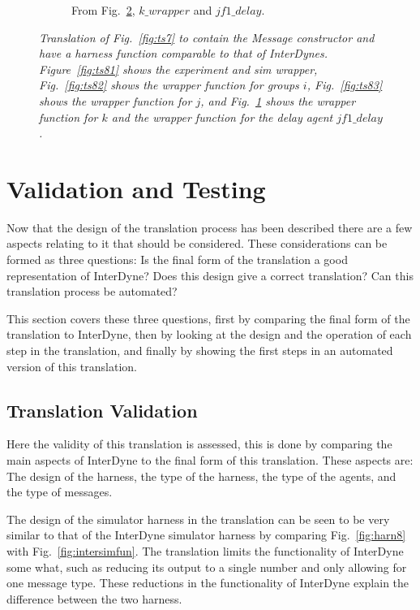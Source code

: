 \documentclass{article}
\begin{document}
\begin{figure}[H]\ContinuedFloat
	\centering
	\begin{subfigure}[b]{1\textwidth}
	
	\caption{From Fig.~\ref{fig:ts8}, $k\_wrapper$ and $jf1\_delay$.}
        \label{fig:ts84}
	\end{subfigure}
	\caption{\it Translation of Fig.~\ref{fig:ts7} to contain the Message constructor and have a harness function comparable to that of InterDynes. Figure~\ref{fig:ts81} shows the experiment and sim wrapper, Fig.~\ref{fig:ts82} shows the wrapper function for groups $i$, Fig.~\ref{fig:ts83} shows the wrapper function for $j$, and Fig.~\ref{fig:ts84} shows the wrapper function for $k$ and the wrapper function for the delay agent $jf1\_delay$.}
	\label{fig:ts8}
\end{figure} 


\newpage
\section{Validation and Testing}
Now that the design of the translation process has been described there are a few aspects relating to it that should be considered. These considerations can be formed as three questions: Is the final form of the translation a good representation of InterDyne? Does this design give a correct translation? Can this translation process be automated?   

This section covers these three questions, first by comparing the final form of the translation to InterDyne, then by looking at the design and the operation of each step in the translation, and finally by showing the first steps in an automated version of this translation.  


\subsection{Translation Validation}
Here the validity of this translation is assessed, this is done by comparing the main aspects of InterDyne to the final form of this translation. These aspects are: The design of the harness, the type of the harness, the type of the agents, and the type of messages. 

The design of the simulator harness in the translation can be seen to be very similar to that of the InterDyne simulator harness by comparing Fig.~\ref{fig:harn8} with Fig.~\ref{fig:intersimfun}. The translation limits the functionality of InterDyne some what, such as reducing its output to a single number and only allowing for one message type. These reductions in the functionality of InterDyne explain the difference between the two harness.
\end{document}
